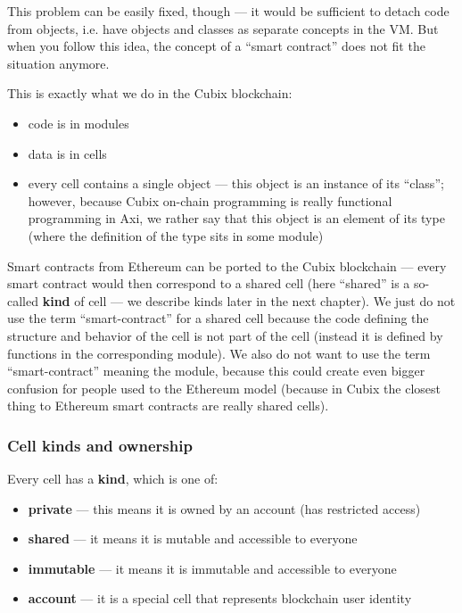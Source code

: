 \documentclass[a4paper]{article}
\begin{document}
This problem can be easily fixed, though --- it would be sufficient to detach code from objects, i.e. have objects and classes as separate concepts in the VM. But when you follow this idea, the concept of a ``smart contract'' does not fit the situation anymore.

This is exactly what we do in the Cubix blockchain:

\begin{itemize}
  \item code is in modules
  \item data is in cells
  \item every cell contains a single object --- this object is an instance of its ``class''; however, because Cubix on-chain programming is really functional programming in Axi, we rather say that this object is an element of its type (where the definition of the type sits in some module)
\end{itemize}

Smart contracts from Ethereum can be ported to the Cubix blockchain --- every smart contract would then correspond to a shared cell (here ``shared'' is a so-called \textbf{kind} of cell --- we describe kinds later in the next chapter). We just do not use the term ``smart-contract'' for a shared cell because the code defining the structure and behavior of the cell is not part of the cell (instead it is defined by functions in the corresponding module). We also do not want to use the term ``smart-contract'' meaning the module, because this could create even bigger confusion for people used to the Ethereum model (because in Cubix the closest thing to Ethereum smart contracts are really shared cells).

\subsubsection{Cell kinds and ownership}

Every cell has a \textbf{kind}, which is one of:

\begin{itemize}
  \item \textbf{private} --- this means it is owned by an account (has restricted access)
  \item \textbf{shared} --- it means it is mutable and accessible to everyone
  \item \textbf{immutable} --- it means it is immutable and accessible to everyone
  \item \textbf{account} --- it is a special cell that represents blockchain user identity
\end{itemize}
\end{document}
